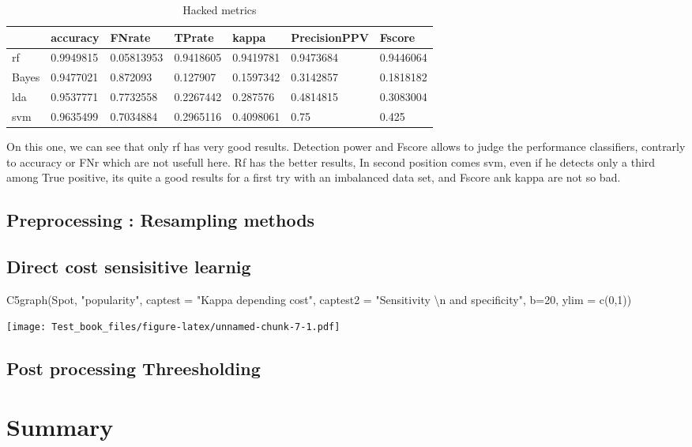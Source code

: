 \documentclass[
]{report}
\newenvironment{Shaded}{\begin{snugshade}}{\end{snugshade}}
\newcommand{\AttributeTok}[1]{\textcolor[rgb]{0.77,0.63,0.00}{#1}}
\newcommand{\DecValTok}[1]{\textcolor[rgb]{0.00,0.00,0.81}{#1}}
\newcommand{\FunctionTok}[1]{\textcolor[rgb]{0.00,0.00,0.00}{#1}}
\newcommand{\NormalTok}[1]{#1}
\newcommand{\SpecialCharTok}[1]{\textcolor[rgb]{0.00,0.00,0.00}{#1}}
\newcommand{\StringTok}[1]{\textcolor[rgb]{0.31,0.60,0.02}{#1}}
\begin{document}
\begin{table}

\caption{\label{tab:unnamed-chunk-6}Hacked metrics}
\centering
\begin{tabular}[t]{l|l|l|l|l|l|l}
\hline
  & accuracy & FNrate & TPrate & kappa & PrecisionPPV & Fscore\\
\hline
rf & 0.9949815 & 0.05813953 & 0.9418605 & 0.9419781 & 0.9473684 & 0.9446064\\
\hline
Bayes & 0.9477021 & 0.872093 & 0.127907 & 0.1597342 & 0.3142857 & 0.1818182\\
\hline
lda & 0.9537771 & 0.7732558 & 0.2267442 & 0.287576 & 0.4814815 & 0.3083004\\
\hline
svm & 0.9635499 & 0.7034884 & 0.2965116 & 0.4098061 & 0.75 & 0.425\\
\hline
\end{tabular}
\end{table}

On this one, we can see that only rf has very good results. Detection power and Fscore allows to judge the performance classifiers, contrarly to accuracy or FNr which are not usefull here. Rf has the better results, In second position comes svm, even if he detects only a third among True positive, its quite a good results for a first try with an imbalanced data set, and Fscore ank kappa are not so bad.

\hypertarget{preprocessing-resampling-methods}{%
\section{Preprocessing : Resampling methods}\label{preprocessing-resampling-methods}}

\hypertarget{direct-cost-sensisitive-learnig}{%
\section{Direct cost sensisitive learnig}\label{direct-cost-sensisitive-learnig}}

\begin{Shaded}
\begin{Highlighting}[]
\FunctionTok{C5graph}\NormalTok{(Spot, }\StringTok{"popularity"}\NormalTok{, }\AttributeTok{captest =} \StringTok{"Kappa depending cost"}\NormalTok{, }\AttributeTok{captest2 =} \StringTok{"Sensitivity }\SpecialCharTok{\textbackslash{}n}\StringTok{ and specificity"}\NormalTok{, }\AttributeTok{b=}\DecValTok{20}\NormalTok{, }\AttributeTok{ylim =} \FunctionTok{c}\NormalTok{(}\DecValTok{0}\NormalTok{,}\DecValTok{1}\NormalTok{))}
\end{Highlighting}
\end{Shaded}

\texttt{[image: Test\_book\_files/figure-latex/unnamed-chunk-7-1.pdf]}

\hypertarget{post-processing-threesholding}{%
\section{Post processing Threesholding}\label{post-processing-threesholding}}

\hypertarget{summary}{%
\chapter{Summary}\label{summary}}

  
\end{document}
